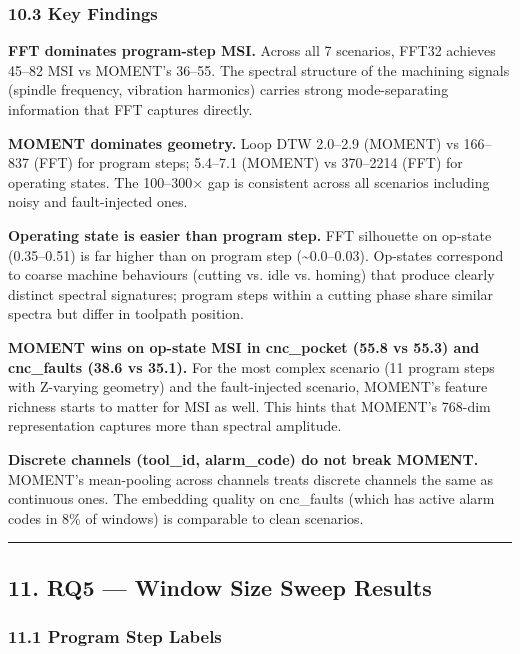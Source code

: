 \documentclass[11pt,a4paper]{article}
\begin{document}
\subsubsection{10.3 Key Findings}

\textbf{FFT dominates program-step MSI.} Across all 7 scenarios, FFT32 achieves 45--82 MSI vs MOMENT's
36--55. The spectral structure of the machining signals (spindle frequency, vibration harmonics)
carries strong mode-separating information that FFT captures directly.

\textbf{MOMENT dominates geometry.} Loop DTW 2.0--2.9 (MOMENT) vs 166--837 (FFT) for program steps;
5.4--7.1 (MOMENT) vs 370--2214 (FFT) for operating states. The 100--300× gap is consistent
across all scenarios including noisy and fault-injected ones.

\textbf{Operating state is easier than program step.} FFT silhouette on op-state (0.35--0.51) is far
higher than on program step (\textasciitilde{}0.0--0.03). Op-states correspond to coarse machine behaviours
(cutting vs. idle vs. homing) that produce clearly distinct spectral signatures; program steps
within a cutting phase share similar spectra but differ in toolpath position.

\textbf{MOMENT wins on op-state MSI in cnc\_pocket (55.8 vs 55.3) and cnc\_faults (38.6 vs 35.1).}
For the most complex scenario (11 program steps with Z-varying geometry) and the fault-injected
scenario, MOMENT's feature richness starts to matter for MSI as well. This hints that MOMENT's
768-dim representation captures more than spectral amplitude.

\textbf{Discrete channels (tool\_id, alarm\_code) do not break MOMENT.} MOMENT's mean-pooling across
channels treats discrete channels the same as continuous ones. The embedding quality on
cnc\_faults (which has active alarm codes in 8\% of windows) is comparable to clean scenarios.

\vspace{4pt}\hrule\vspace{4pt}

\subsection{11. RQ5 --- Window Size Sweep Results}

\subsubsection{11.1 Program Step Labels}
\end{document}
